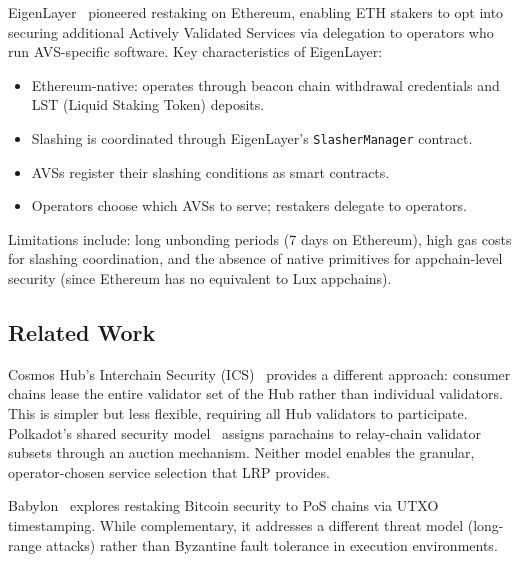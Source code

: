 EigenLayer~\cite{eigen2023restaking} pioneered restaking on Ethereum, enabling ETH stakers
to opt into securing additional Actively Validated Services via delegation to operators who
run AVS-specific software. Key characteristics of EigenLayer:

\begin{itemize}[leftmargin=1.5em]
  \item Ethereum-native: operates through beacon chain withdrawal credentials and LST
    (Liquid Staking Token) deposits.
  \item Slashing is coordinated through EigenLayer's \texttt{SlasherManager} contract.
  \item AVSs register their slashing conditions as smart contracts.
  \item Operators choose which AVSs to serve; restakers delegate to operators.
\end{itemize}

Limitations include: long unbonding periods (7 days on Ethereum), high gas costs for
slashing coordination, and the absence of native primitives for appchain-level security
(since Ethereum has no equivalent to Lux appchains).

\subsection{Related Work}

Cosmos Hub's Interchain Security (ICS)~\cite{cosmos2022ics} provides a different approach:
consumer chains lease the entire validator set of the Hub rather than individual validators.
This is simpler but less flexible, requiring all Hub validators to participate. Polkadot's
shared security model~\cite{wood2016polkadot} assigns parachains to relay-chain validator
subsets through an auction mechanism. Neither model enables the granular, operator-chosen
service selection that LRP provides.

Babylon~\cite{babylon2023bitcoin} explores restaking Bitcoin security to PoS chains via
UTXO timestamping. While complementary, it addresses a different threat model (long-range
attacks) rather than Byzantine fault tolerance in execution environments.

